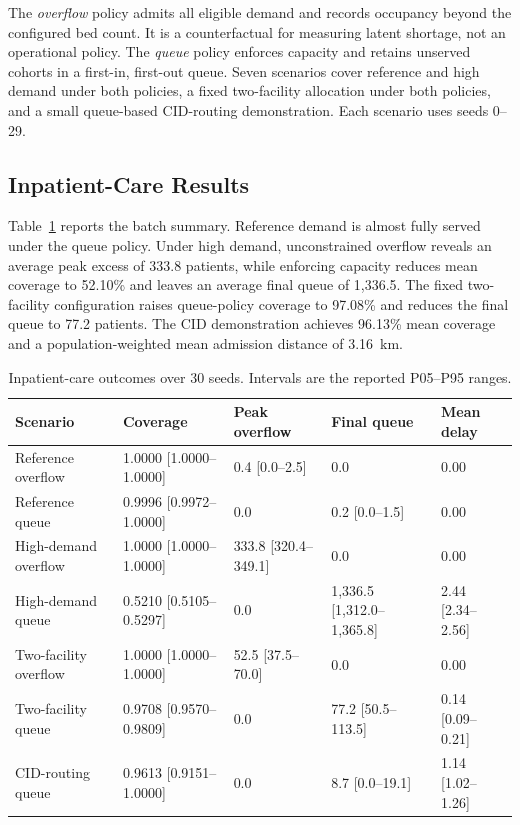 \documentclass[pdflatex,sn-mathphys-num]{sn-jnl}%
\theoremstyle{thmstyleone}%
\theoremstyle{thmstyletwo}%
\theoremstyle{thmstylethree}%
\begin{document}
The \textit{overflow} policy admits all eligible demand and records occupancy beyond the configured bed count. It is a counterfactual for measuring latent shortage, not an operational policy. The \textit{queue} policy enforces capacity and retains unserved cohorts in a first-in, first-out queue. Seven scenarios cover reference and high demand under both policies, a fixed two-facility allocation under both policies, and a small queue-based CID-routing demonstration. Each scenario uses seeds 0--29.



\subsection{Inpatient-Care Results}
Table~\ref{tbl:inpatient_results} reports the batch summary. Reference demand is almost fully served under the queue policy. Under high demand, unconstrained overflow reveals an average peak excess of 333.8 patients, while enforcing capacity reduces mean coverage to 52.10\% and leaves an average final queue of 1,336.5. The fixed two-facility configuration raises queue-policy coverage to 97.08\% and reduces the final queue to 77.2 patients. The CID demonstration achieves 96.13\% mean coverage and a population-weighted mean admission distance of 3.16~km.

\begin{table}[ht]
\centering
\footnotesize
\caption{Inpatient-care outcomes over 30 seeds. Intervals are the reported P05--P95 ranges.}
\label{tbl:inpatient_results}
\begin{tabularx}{\linewidth}{@{}lXXXX@{}}
\toprule
\textbf{Scenario} & \textbf{Coverage} & \textbf{Peak overflow} & \textbf{Final queue} & \textbf{Mean delay} \\ \midrule
Reference overflow & 1.0000 [1.0000--1.0000] & 0.4 [0.0--2.5] & 0.0 & 0.00 \\ 
Reference queue & 0.9996 [0.9972--1.0000] & 0.0 & 0.2 [0.0--1.5] & 0.00 \\ 
High-demand overflow & 1.0000 [1.0000--1.0000] & 333.8 [320.4--349.1] & 0.0 & 0.00 \\ 
High-demand queue & 0.5210 [0.5105--0.5297] & 0.0 & 1,336.5 [1,312.0--1,365.8] & 2.44 [2.34--2.56] \\ 
Two-facility overflow & 1.0000 [1.0000--1.0000] & 52.5 [37.5--70.0] & 0.0 & 0.00 \\ 
Two-facility queue & 0.9708 [0.9570--0.9809] & 0.0 & 77.2 [50.5--113.5] & 0.14 [0.09--0.21] \\ 
CID-routing queue & 0.9613 [0.9151--1.0000] & 0.0 & 8.7 [0.0--19.1] & 1.14 [1.02--1.26] \\ \bottomrule
\end{tabularx}
\end{table}
\end{document}
